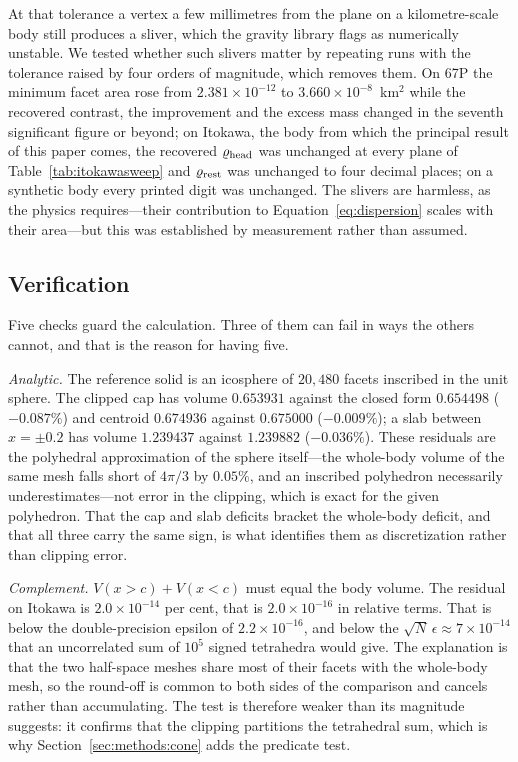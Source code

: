 At that tolerance a vertex a few millimetres from the plane on a
kilometre-scale body still produces a sliver, which the gravity library
flags as numerically unstable. We tested whether such slivers matter by
repeating runs with the tolerance raised by four orders of magnitude,
which removes them. On 67P the minimum facet area rose from
$2.381\times10^{-12}$ to $3.660\times10^{-8}$~km$^{2}$ while the
recovered contrast, the improvement and the excess mass changed in the
seventh significant figure or beyond; on Itokawa, the body from which the
principal result of this paper comes, the recovered $\varrho_{\mathrm{head}}$ was
unchanged at every plane of Table~\ref{tab:itokawasweep} and $\varrho_{\mathrm{rest}}$
was unchanged to four decimal places;
on a synthetic body every printed digit was unchanged. The slivers are
harmless, as the physics requires---their contribution to
Equation~\eqref{eq:dispersion} scales with their area---but this was
established by measurement rather than assumed.

\subsection{Verification}
\label{sec:methods:verify}

Five checks guard the calculation. Three of them can fail in ways the
others cannot, and that is the reason for having five.

\emph{Analytic.} The reference solid is an icosphere of $20{,}480$ facets
inscribed in the unit sphere.
The clipped cap has volume $0.653931$ against the closed form $0.654498$
($-0.087\%$) and centroid $0.674936$ against $0.675000$ ($-0.009\%$); a
slab between $x=\pm0.2$ has volume $1.239437$ against $1.239882$
($-0.036\%$). These residuals are the polyhedral approximation of the
sphere itself---the whole-body volume of the same mesh falls short of
$4\pi/3$ by $0.05\%$, and an inscribed polyhedron necessarily
underestimates---not error in the clipping, which is exact for the given
polyhedron. That the cap and slab deficits bracket the whole-body
deficit, and that all three carry the same sign, is what identifies them
as discretization rather than clipping error.

\emph{Complement.} $V(x>c) + V(x<c)$ must equal the body volume. The
residual on Itokawa is $2.0\times10^{-14}$ per cent, that is
$2.0\times10^{-16}$ in relative terms. That is below the double-precision
epsilon of $2.2\times10^{-16}$, and below the $\sqrt{N}\,\epsilon \approx
7\times10^{-14}$ that an uncorrelated sum of $10^{5}$ signed tetrahedra would
give. The explanation is that the two half-space meshes share most of their
facets with the whole-body mesh, so the round-off is common to both sides of
the comparison and cancels rather than accumulating. The test is therefore
weaker than its magnitude suggests: it confirms that the clipping partitions
the tetrahedral sum, which is why Section~\ref{sec:methods:cone} adds the
predicate test.

